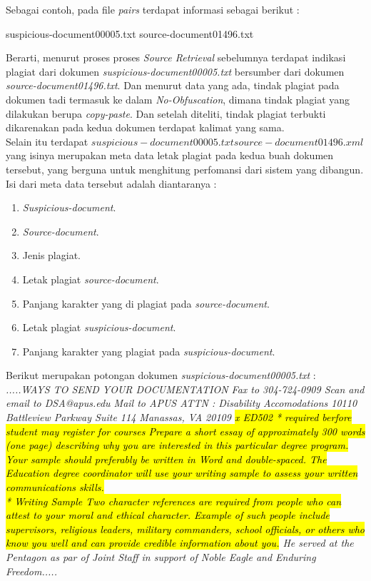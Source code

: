 \documentclass[../Book.tex]{subfiles}
\begin{document}
	\noindent Sebagai contoh, pada file \textit{pairs} terdapat informasi sebagai berikut : 
	
	\begin{center}
		\centering
		suspicious-document00005.txt source-document01496.txt
	\end{center}
	
	\noindent Berarti, menurut proses proses \textit{Source Retrieval} sebelumnya terdapat indikasi plagiat dari dokumen \textit{suspicious-document00005.txt} bersumber dari dokumen \textit{source-document01496.txt}. Dan menurut data yang ada, tindak plagiat pada dokumen tadi termasuk ke dalam \textit{No-Obfuscation}, dimana tindak plagiat yang dilakukan berupa \textit{copy-paste}. Dan setelah diteliti, tindak plagiat terbukti dikarenakan pada kedua dokumen terdapat kalimat yang sama. \\
	
	\noindent Selain itu terdapat $suspicious-document00005.txt source-document01496.xml$ yang isinya merupakan meta data letak plagiat pada kedua buah dokumen tersebut, yang berguna untuk menghitung perfomansi dari sistem yang dibangun. Isi dari meta data tersebut adalah diantaranya :
	
	\begin{enumerate}
		\item \textit{Suspicious-document}.
		\item \textit{Source-document}.
		\item Jenis plagiat.
		\item Letak plagiat \textit{source-document}.
		\item Panjang karakter yang di plagiat pada \textit{source-document}.
		\item Letak plagiat \textit{suspicious-document}.
		\item Panjang karakter yang plagiat pada \textit{suspicious-document}.
	\end{enumerate}
	
	\noindent Berikut merupakan potongan dokumen \textit{suspicious-document00005.txt} : \\
	
	\textit{.....WAYS TO SEND YOUR DOCUMENTATION Fax to 304-724-0909 Scan and email to DSA@apus.edu Mail to APUS ATTN : Disability Accomodations 10110 Battleview Parkway Suite 114 Manassas, VA 20109 \hl{x ED502 * required berfore student may register for courses Prepare a short essay of approximately 300 words (one page) describing why you are interested in this particular degree program. Your sample should preferably be written in Word and double-spaced. The Education degree coordinator will use your writing sample to assess your written communications skills.\\ * Writing Sample Two character references are required from people who can attest to your moral and ethical character. Example of such people include supervisors, religious leaders, military commanders, school officials, or others who know you well and can provide credible information about you.} He served at the Pentagon as par of Joint Staff in support of Noble Eagle and Enduring Freedom.....} \\
	
\end{document}
